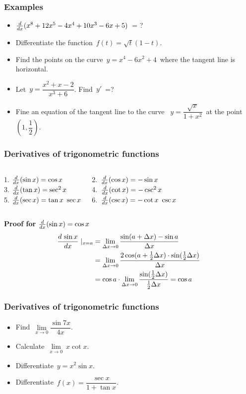  \begin{frame}[fragile] \frametitle{Examples}

\begin{itemize}
	\item $\frac{d {} }{d x} (x^8+12x^5-4x^4+10 x^3-6x+5)$\ = ?\\
	\item Differentiate the function\ $f(t)=\sqrt t (1-t)$.  
	\item Find the points on the curve\ $y=x^4-6x^2+4$\ where the tangent line is horizontal. 
	\item Let\ $y=\dfrac{x^2+x-2}{x^3+6}$. Find\ $y'$\ =?\\
	\item Fine an equation of the tangent line to the curve \ $y=\dfrac{\sqrt x}{1+x^2}$\ at the point\ $(1,\dfrac{1}{2})$.  
\end{itemize}
\end{frame}

 \begin{frame}[fragile] \frametitle{Derivatives of trigonometric functions}

\begin{columns}[t]
\column{4.5cm}
1.\; $\frac{d {} }{d x} (\sin x) = \cos x$ \\
3.\; $\frac{d {} }{d x} (\tan x) = \sec^2 x$ \\
5.\; $\frac{d {} }{d x} (\sec x) = \tan x \ \sec x$

\column{4.5cm}
2.\ $\frac{d {} }{d x} (\cos x) = - \sin x$ \\
4.\ $\frac{d {} }{d x} (\cot x) = - \csc^2 x$ \\
6.\ $\frac{d {} }{d x} (\csc x) = - \cot x \ \csc x$
\end{columns}


\textbf{Proof for $\frac{d {} }{d x} (\sin x) = \cos x$ }
\begin{align*}
\frac{d {\ \sin x} }{d x}\mid_{x= a} &= \lim_{\Delta x \to 0} \frac{\sin (a+\Delta x) - \sin a}{\Delta x} \\
 &= \lim_{\Delta x \to 0} \frac{2 \cos (a+\frac{1}{2}\Delta x)\cdot \sin (\frac{1}{2}\Delta x) } {\Delta x} \\
 &= \cos a \cdot \lim_{\Delta x \to 0} \frac{\sin (\frac{1}{2}\Delta x)}{\frac{1}{2}\Delta x} = \cos a 
\end{align*}


\end{frame}

 \begin{frame}[fragile] \frametitle{Derivatives of trigonometric functions}
\begin{itemize}
  \item Find\ $\lim\limits_{x\to 0} \dfrac{\sin 7x}{4x}$.
	\item Calculate\ $\lim\limits_{x\to 0}\ x\cot x$.  
	\item Differentiate\ $y=x^2 \sin x$.  
	\item Differentiate\ $f(x)=\dfrac{\sec x}{1+\tan x}$.		
\end{itemize}
\end{frame}

